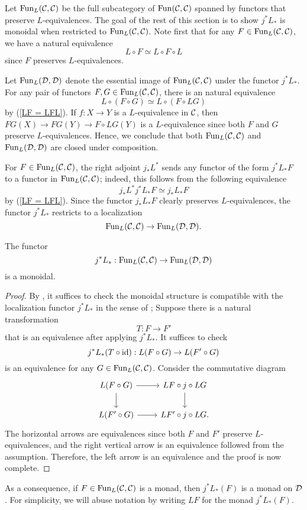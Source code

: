 Let $\operatorname{Fun}_L({\mathcal{C}},{\mathcal{C}})$ be the full subcategory of $\operatorname{Fun}({\mathcal{C}},{\mathcal{C}})$ spanned by functors that preserve $L$-equivalences. 
The goal of the rest of this section is to show $j^*L_*$ is monoidal when restricted to $\operatorname{Fun}_L({\mathcal{C}},{\mathcal{C}})$.
Note first that for any $F\in \operatorname{Fun}_L({\mathcal{C}},{\mathcal{C}})$, we have a natural equivalence
\begin{equation}
\label{LF = LFL}
	L\circ F \simeq L\circ F\circ L
\end{equation}
since $F$ preserves $L$-equivalences.
\begin{remark}
Let $\operatorname{Fun}_L({\mathcal{D}},{\mathcal{D}})$ denote the essential image of $\operatorname{Fun}_L({\mathcal{C}},{\mathcal{C}})$ under the functor $j^*L_*$.
For any pair of functors $F,G\in \operatorname{Fun}_L({\mathcal{C}},{\mathcal{C}})$, there is an natural equivalence
$$
L\circ (F\circ G) \simeq L\circ (F\circ L G)
$$ 
by (\ref{LF = LFL}).
If $f:X\to Y$ is a $L$-equivalence in ${\mathcal{C}}$, then
$FG(X) \to FG(Y) \to F\circ LG(Y)$ is a $L$-equivalence since both $F$ and $G$ preserve $L$-equivalences.
Hence, we conclude that both $\operatorname{Fun}_L({\mathcal{C}},{\mathcal{C}})$ and $\operatorname{Fun}_L({\mathcal{D}},{\mathcal{D}})$ are closed under composition.
\end{remark}


For $F\in \operatorname{Fun}_{L}({\mathcal{C}},{\mathcal{C}})$, the right adjoint $j_*L^*$ sends any functor of the form $j^*L_*F$ to a functor in $\operatorname{Fun}_L({\mathcal{C}},{\mathcal{C}})$; indeed, this follows from the following equivalence
$$
j_*L^*j^*L_* F \simeq j_*L_*F
$$
by (\ref{LF = LFL}).
Since the functor $j_*L_*F$ clearly preserves $L$-equivalences, the functor $j^*L_*$ restricts to a localization
$$
\operatorname{Fun}_L({\mathcal{C}},{\mathcal{C}}) 
	\to 
	\operatorname{Fun}_L({\mathcal{D}},{\mathcal{D}}).
$$
\begin{lemma}
\label{j^*L_* is monoidal when restricted to Fun_L}
	The functor
	$$
	j^*L_*:\operatorname{Fun}_L({\mathcal{C}},{\mathcal{C}}) 
	\to 
	\operatorname{Fun}_L({\mathcal{D}},{\mathcal{D}})
	$$
	is a monoidal.
\end{lemma}
\begin{proof}
By \cite[Proposition 2.2.1.9.]{HA}, it suffices to check the monoidal structure is compatible with the localization functor $j^*L_*$ in the sense of \cite[Definition 2.2.1.6.]{HA};
	Suppose there is a natural transformation 
$$
T: F \to F'
$$
that is an equivalence after applying $j^*L_*$. 
It suffices to check
$$
j^*L_*(T\circ \operatorname{id}):
L(F\circ G) \to 
L(F'\circ G)
$$ 
is an equivalence for any $G\in \operatorname{Fun}_L({\mathcal{C}},{\mathcal{C}}) $.
Consider the commutative diagram
\[
\begin{tikzcd}
L(F\circ G) & LF \circ j\circ LG\\
L(F'\circ G) & LF' \circ j\circ LG.
    \arrow[from=1-1, to=1-2]
	\arrow[from=1-1, to=2-1]
	\arrow[from=2-1, to=2-2]
	\arrow[from=1-2, to=2-2]
\end{tikzcd}
\]
The horizontal arrows are equivalences since both $F$ and $F'$ preserve $L$-equivalences, and the right vertical arrow is an equivalence followed from the assumption.
Therefore, the left arrow is an equivalence and the proof is now complete.
\end{proof}
\begin{remark}
\label{j^*L_* is monoidal on Fun_L}
As a consequence, if $F\in \operatorname{Fun}_{L}({\mathcal{C}},{\mathcal{C}})$ is a monad, then 
$j^*L_*(F)$ is a monad on ${\mathcal{D}}$. For simplicity, we will abuse notation by writing $LF$ for the monad $j^*L_*(F)$.
\end{remark}


